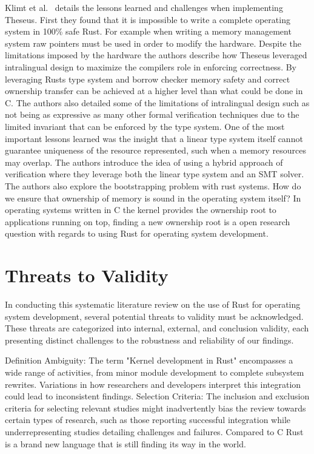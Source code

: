 \documentclass[sigconf,review,anonymous]{acmart}
\begin{document}
Klimt et al.~\cite{Klimt2023-ob} details the lessons learned and challenges when implementing
Theseus. First they found that it is impossible to write a complete operating system in 100\% safe
Rust. For example when writing a memory management system raw pointers must be used in order to
modify the hardware. Despite the limitations imposed by the hardware the authors describe how
Theseus leveraged intralingual design to maximize the compilers role in enforcing correctness. By
leveraging Rusts type system and borrow checker memory safety and correct ownership transfer can be
achieved at a higher level than what could be done in C. The authors also detailed some of the
limitations of intralingual design such as not being as expressive as many other formal verification
techniques due to the limited invariant that can be enforced by the type system. One of the most
important lessons learned was the insight that a linear type system itself cannot guarantee
uniqueness of the resource represented, such when a memory resources may overlap. The authors
introduce the idea of using a hybrid approach of verification where they leverage both the linear
type system and an SMT solver. The authors also explore the bootstrapping problem with rust
systems. How do we ensure that ownership of memory is sound in the operating system itself? In
operating systems written in C the kernel provides the ownership root to applications running on
top, finding a new ownership root is a open research question with regards to using Rust for
operating system development.

\section{Threats to Validity}

In conducting this systematic literature review on the use of Rust for operating system development,
several potential threats to validity must be acknowledged. These threats are categorized into
internal, external, and conclusion validity, each presenting distinct challenges to the robustness
and reliability of our findings.

Definition Ambiguity: The term "Kernel development in Rust" encompasses a wide range of activities,
from minor module development to complete subsystem rewrites. Variations in how researchers and
developers interpret this integration could lead to inconsistent findings. Selection Criteria: The
inclusion and exclusion criteria for selecting relevant studies might inadvertently bias the review
towards certain types of research, such as those reporting successful integration while
underrepresenting studies detailing challenges and failures. Compared to C Rust is a brand new
language that is still finding its way in the world.
\end{document}

